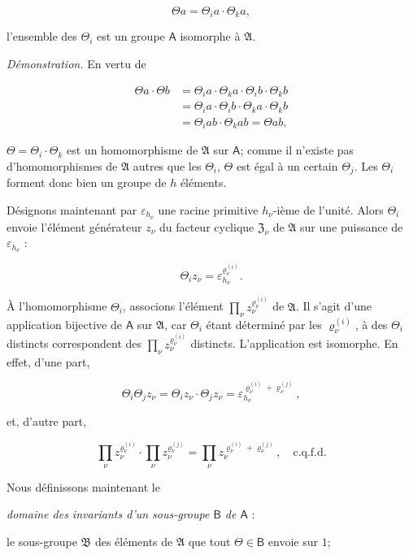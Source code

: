 \[\Theta a = \Theta_i a \cdot \Theta_k a,\]

l'ensemble des \(\Theta_i\) est un groupe \(\mathsf A\) isomorphe à \(\mathfrak A\).

\emph{Démonstration.} En vertu de

\[\begin{aligned}
\Theta a \cdot \Theta b &= \Theta_i a \cdot \Theta_k a \cdot \Theta_i b \cdot \Theta_k b \\
&= \Theta_i a \cdot \Theta_i b \cdot \Theta_k a \cdot \Theta_k b \\
&= \Theta_i a b \cdot \Theta_k a b = \Theta a b,
\end{aligned}\]

\(\Theta = \Theta_i \cdot \Theta_k\) est un homomorphisme de \(\mathfrak A\) sur \(\mathsf A\); comme il n'existe pas d'homomorphismes de \(\mathfrak A\) autres que les \(\Theta_i\), \(\Theta\) est égal à un certain \(\Theta_j\). Les \(\Theta_i\) forment donc bien un groupe de \(h\) éléments.

Désignons maintenant par \(\varepsilon_{h_\nu}\) une racine primitive \(h_\nu\)-ième de l'unité. Alors \(\Theta_i\) envoie l'élément générateur \(z_\nu\) du facteur cyclique \(\mathfrak Z_\nu\) de \(\mathfrak A\) sur une puissance de \(\varepsilon_{h_\nu}\) :

\[
\Theta_i z_\nu=\varepsilon_{h_\nu}^{\varrho_\nu^{(i)}}.
\]

À l'homomorphisme \(\Theta_i\), associons l'élément \(\prod_\nu z_\nu^{\varrho_\nu^{(i)}}\) de \(\mathfrak A\). Il s'agit d'une application bijective de \(\mathsf A\) sur \(\mathfrak A\), car \(\Theta_i\) étant déterminé par les \(\varrho_\nu^{(i)}\), à des \(\Theta_i\) distincts correspondent des \(\prod_\nu z_\nu^{\varrho_\nu^{(i)}}\) distincts. L'application est isomorphe. En effet, d'une part,

\[
\Theta_i\Theta_j z_\nu=\Theta_i z_\nu\cdot \Theta_j z_\nu
=\varepsilon_{h_\nu}^{\varrho_\nu^{(i)}+\varrho_\nu^{(j)}},
\]

et, d'autre part,

\[
\prod_\nu z_\nu^{\varrho_\nu^{(i)}}\cdot
\prod_\nu z_\nu^{\varrho_\nu^{(j)}}=
\prod_\nu z_\nu^{\varrho_\nu^{(i)}+\varrho_\nu^{(j)}},
\quad\text{c.q.f.d.}
\]

Nous définissons maintenant le

\emph{domaine des invariants d'un sous-groupe \(\mathsf B\) de \(\mathsf A\)} :

le sous-groupe \(\mathfrak B\) des éléments de \(\mathfrak A\) que tout \(\Theta\in\mathsf B\) envoie sur \(1\);

